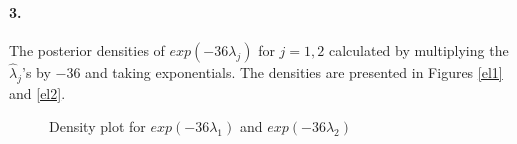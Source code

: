 \documentclass[12pt, leqno]{article}
\begin{document}
\paragraph{3.}

The posterior densities of $exp(-36 \lambda_j)$ for $j=1,2$ calculated by
multiplying the $\hat{\lambda}_j$'s by $-36$ and taking exponentials. The
densities are presented
in Figures \ref{el1} and \ref{el2}. 

\begin{figure}
\centering
{}
\centering
\qquad
\centering
{}
\caption{Density plot for $exp(-36 \lambda_1)$ and $exp(-36 \lambda_2)$}
\end{figure}
\end{document}
